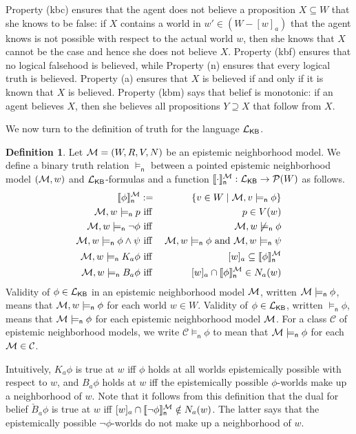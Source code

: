 \documentclass[12pt]{article}
\theoremstyle{definition}
\newtheorem{definition}[theorem]{Definition}
\newcommand{\pow}{{\cal P}}    %
\newcommand{\M}{{\cal M}}      %
\newcommand{\Lang}{{\cal L}}   %
\newcommand{\KB}{{\mathsf{KB}}}                        %
\newcommand{\modelsn}{\models_{\mathsf{n}}}                  %
\newcommand{\semn}[1]{\llbracket{#1}\rrbracket_{\mathsf{n}}} %
\begin{document}
Property (kbc) ensures that the agent does not believe a proposition
$X\subseteq W$ that she knows to be false: if $X$ contains a world in
$w'\in(W-[w]_a)$ that the agent knows is not possible with respect to
the actual world $w$, then she knows that $X$ cannot be the case and
hence she does not believe $X$.  Property (kbf) ensures that no
logical falsehood is believed, while Property (n) ensures that every
logical truth is believed.  Property (a) ensures that $X$ is believed
if and only if it is known that $X$ is believed. Property (kbm) says
that belief is monotonic: if an agent believes $X$, then she believes
all propositions $Y\supseteq X$ that follow from $X$.

We now turn to the definition of truth for the language $\Lang_\KB$.

\begin{definition} 
  Let $\M = (W,R,V,N)$ be an epistemic neighborhood model.  We define
  a binary truth relation $\modelsn$ between a pointed epistemic
  neighborhood model $(\M,w)$ and $\Lang_\KB$-formulas and a function
  $\semn{\cdot}^\M:\Lang_\KB\to \pow(W)$ as follows.
  \begin{eqnarray*} 
    \semn{\phi}^\M & := & \{v\in W\mid \M,v\modelsn\phi\}
    \\
    \M, w \modelsn p & \text{ iff } & p \in V(w) 
    \\
    \M, w \modelsn \neg \phi & \text{ iff } & \M, w \not\modelsn \phi 
    \\
    \M, w \modelsn \phi\land\psi  & \text{ iff } 
    & \M, w \modelsn \phi \text{ and } \M, w \modelsn \psi
    \\
    \M, w \modelsn K_a \phi  & \text{ iff } & 
    [w]_a\subseteq\semn{\phi}^\M
    \\
    \M, w \modelsn B_a \phi  & \text{ iff } &
    [w]_a\cap \semn{\phi}^\M \in N_a(w)
  \end{eqnarray*}
  Validity of $\phi\in\Lang_\KB$ in an epistemic neighborhood model
  $\M$, written $\M\modelsn\phi$, means that $\M,w\modelsn\phi$ for
  each world $w\in W$.  Validity of $\phi\in\Lang_\KB$, written
  $\modelsn\phi$, means that $\M\modelsn\phi$ for each epistemic
  neighborhood model $\M$.  For a class $\mathcal{C}$ of epistemic
  neighborhood models, we write $\mathcal{C}\modelsn\phi$ to mean that
  $\M\modelsn\phi$ for each $\M\in\mathcal{C}$.
\end{definition}

Intuitively, $K_a\phi$ is true at $w$ iff $\phi$ holds at all worlds
epistemically possible with respect to $w$, and $B_a\phi$ holds at $w$
iff the epistemically possible $\phi$-worlds make up a neighborhood of
$w$.  Note that it follows from this definition that the dual for
belief $\check{B}_a \phi$ is true at $w$ iff
$[w]_a\cap\semn{\neg\phi}^\M\notin N_a(w)$.  The latter says that the
epistemically possible $\lnot\phi$-worlds do not make up a
neighborhood of $w$.
\end{document}
